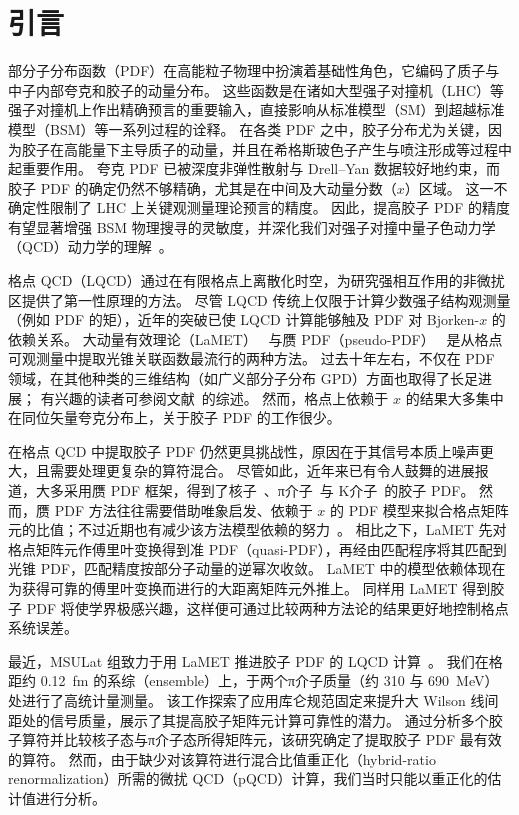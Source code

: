 \section{引言}
\label{sec:intro}

部分子分布函数（PDF）在高能粒子物理中扮演着基础性角色，它编码了质子与中子内部夸克和胶子的动量分布。
这些函数是在诸如大型强子对撞机（LHC）等强子对撞机上作出精确预言的重要输入，直接影响从标准模型（SM）到超越标准模型（BSM）等一系列过程的诠释。
在各类 PDF 之中，胶子分布尤为关键，因为胶子在高能量下主导质子的动量，并且在希格斯玻色子产生与喷注形成等过程中起重要作用。
夸克 PDF 已被深度非弹性散射与 Drell--Yan 数据较好地约束，而胶子 PDF 的确定仍然不够精确，尤其是在中间及大动量分数（$x$）区域。
这一不确定性限制了 LHC 上关键观测量理论预言的精度。
因此，提高胶子 PDF 的精度有望显著增强 BSM 物理搜寻的灵敏度，并深化我们对强子对撞中量子色动力学（QCD）动力学的理解~\cite{Amoroso:2022eow}。

格点 QCD（LQCD）通过在有限格点上离散化时空，为研究强相互作用的非微扰区提供了第一性原理的方法。
尽管 LQCD 传统上仅限于计算少数强子结构观测量（例如 PDF 的矩），近年的突破已使 LQCD 计算能够触及 PDF 对 Bjorken-$x$ 的依赖关系。
大动量有效理论（LaMET）~\cite{Ji:2013dva} 与赝 PDF（pseudo-PDF）~\cite{Radyushkin:2017cyf} 是从格点可观测量中提取光锥关联函数最流行的两种方法。
过去十年左右，不仅在 PDF 领域，在其他种类的三维结构（如广义部分子分布 GPD）方面也取得了长足进展；
有兴趣的读者可参阅文献~\cite{Ji:2020ect,Constantinou:2020hdm,Lin:2023kxn}的综述。
然而，格点上依赖于 $x$ 的结果大多集中在同位矢量夸克分布上，关于胶子 PDF 的工作很少。

在格点 QCD 中提取胶子 PDF 仍然更具挑战性，原因在于其信号本质上噪声更大，且需要处理更复杂的算符混合。
尽管如此，近年来已有令人鼓舞的进展报道，大多采用赝 PDF 框架，得到了核子~\cite{Fan:2020cpa, Fan:2022kcb, HadStruc:2021wmh, Delmar:2023agv, HadStruc:2022yaw}、π介子~\cite{Good:2023ecp}与 K介子~\cite{Salas-Chavira:2021wui}的胶子 PDF。
然而，赝 PDF 方法往往需要借助唯象启发、依赖于 $x$ 的 PDF 模型来拟合格点矩阵元的比值；不过近期也有减少该方法模型依赖的努力~\cite{Karpie:2019eiq, Karpie:2021pap}。
相比之下，LaMET 先对格点矩阵元作傅里叶变换得到准 PDF（quasi-PDF），再经由匹配程序将其匹配到光锥 PDF，匹配精度按部分子动量的逆幂次收敛。
LaMET 中的模型依赖体现在为获得可靠的傅里叶变换而进行的大距离矩阵元外推上。
同样用 LaMET 得到胶子 PDF 将使学界极感兴趣，这样便可通过比较两种方法论的结果更好地控制格点系统误差。

最近，MSULat 组致力于用 LaMET 推进胶子 PDF 的 LQCD 计算~\cite{Good:2024iur}。
我们在格距约 0.12~fm 的系综（ensemble）上，于两个π介子质量（约 310 与 690~MeV）处进行了高统计量测量。
该工作探索了应用库仑规范固定来提升大 Wilson 线间距处的信号质量，展示了其提高胶子矩阵元计算可靠性的潜力。
通过分析多个胶子算符并比较核子态与π介子态所得矩阵元，该研究确定了提取胶子 PDF 最有效的算符。
然而，由于缺少对该算符进行混合比值重正化（hybrid-ratio renormalization）所需的微扰 QCD（pQCD）计算，我们当时只能以重正化的估计值进行分析。

